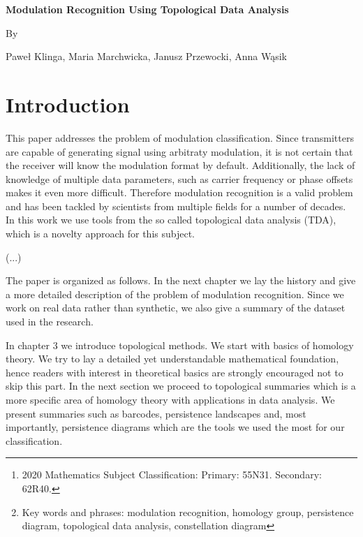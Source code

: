 \documentclass[12pt]{article}
\theoremstyle{plain}
\theoremstyle{definition}
\theoremstyle{remark}
\begin{document}
	
	\begin{center}{\bf \Large
			Modulation Recognition Using Topological Data Analysis
		}
	\end{center}
	\smallskip
	\begin{center}
		By
	\end{center}
	\smallskip
	\begin{center} Pawe\l{} Klinga, Maria Marchwicka, Janusz Przewocki, Anna W\k{a}sik
	\end{center}
	
	\begin{abstract}
		In this paper we apply topological methods to the problem of modulation recognition. We use tools from the growing field of topological data analysis, namely persistent homology followed by machine learning algorithms to distinguish between a large number of significant modulation types.
		\let\thefootnote\relax\footnote{2020 Mathematics Subject Classification: Primary: 55N31. Secondary: 62R40.
		}
		\let\thefootnote\relax\footnote{Key words and phrases: modulation recognition, homology group, persistence diagram, topological data analysis, constellation diagram}
	\end{abstract}
	
	
	\section{Introduction}
	
	This paper addresses the problem of modulation classification. Since transmitters are capable of generating signal using arbitraty modulation, it is not certain that the receiver will know the modulation format by default. Additionally, the lack of knowledge of multiple data parameters, such as carrier frequency or phase offsets makes it even more difficult. Therefore modulation recognition is a valid problem and has been tackled by scientists from multiple fields for a number of decades. In this work we use tools from the so called topological data analysis (TDA), which is a novelty approach for this subject.
	
	(...)
	
	The paper is organized as follows. In the next chapter we lay the history and give a more detailed description of the problem of modulation recognition. Since we work on real data rather than synthetic, we also give a summary of the dataset used in the research.
	
	In chapter 3 we introduce topological methods. We start with basics of homology theory. We try to lay a detailed yet understandable mathematical foundation, hence readers with interest in theoretical basics are strongly encouraged not to skip this part. In the next section we proceed to topological summaries which is a more specific area of homology theory with applications in data analysis. We present summaries such as barcodes, persistence landscapes and, most importantly, persistence diagrams which are the tools we used the most for our classification.
	
\end{document}
